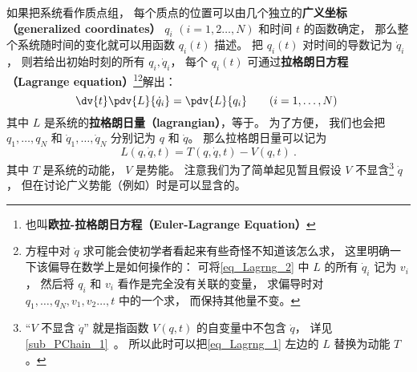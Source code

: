 

如果把系统看作质点组， 每个质点的位置可以由几个独立的\textbf{广义坐标（generalized coordinates）} $q_i$ $(i=1,2\dots,N)$ 和时间 $t$ 的函数确定， 那么整个系统随时间的变化就可以用函数 $q_i(t)$ 描述。 把 $q_i(t)$ 对时间的导数记为 $\dot q_i$， 则若给出初始时刻的所有 $q_i, \dot q_i$， 每个 $q_i(t)$ 可通过\textbf{拉格朗日方程（Lagrange equation）}\footnote{也叫\textbf{欧拉-拉格朗日方程（Euler-Lagrange Equation）}}\footnote{方程中对 $\dot q$ 求可能会使初学者看起来有些奇怪不知道该怎么求， 这里明确一下该偏导在数学上是如何操作的： 可将\autoref{eq_Lagrng_2} 中 $L$ 的所有 $\dot q_i$ 记为 $v_i$， 然后将 $q_i$ 和 $v_i$ 看作是完全没有关联的变量， 求偏导时对 $q_1,\dots, q_N, v_1, v_2\dots,t$ 中的一个求， 而保持其他量不变。}解出：
\begin{equation}\label{eq_Lagrng_1}
\dv{t} \pdv{L}{\dot q_i} = \pdv{L}{q_i}
\qquad (i=1,\dots,N)~
\end{equation}
其中 $L$ 是系统的\textbf{拉格朗日量（lagrangian）}，等于。 为了方便， 我们也会把 $q_1, \dots, q_N$ 和 $\dot q_1,\dots,\dot q_N$ 分别记为 $q$ 和 $\dot q$。 那么拉格朗日量可以记为
\begin{equation}\label{eq_Lagrng_2}
L(q, \dot q, t) = T(q, \dot q, t) - V(q, t)~.
\end{equation}
其中 $T$ 是系统的动能， $V$ 是势能。 注意我们为了简单起见暂且假设 $V$ 不显含\footnote{“$V$ 不显含 $\dot q$” 就是指函数 $V(q,t)$ 的自变量中不包含 $\dot q$， 详见\autoref{sub_PChain_1}~。 所以此时可以把\autoref{eq_Lagrng_1} 左边的 $L$ 替换为动能 $T$。} $\dot q$， 但在讨论广义势能（例如）时是可以显含的。



